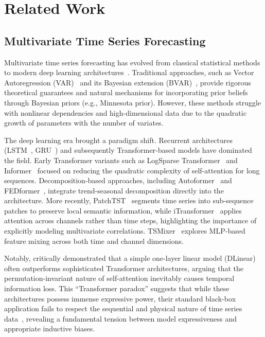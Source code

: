 \section{Related Work}

\subsection{Multivariate Time Series Forecasting}

Multivariate time series forecasting has evolved from classical statistical methods to modern deep learning architectures~\citep{lim2021time}. Traditional approaches, such as Vector Autoregression (VAR)~\citep{lutkepohl2005new} and its Bayesian extension (BVAR)~\citep{banbura2010large}, provide rigorous theoretical guarantees and natural mechanisms for incorporating prior beliefs through Bayesian priors (e.g., Minnesota prior). However, these methods struggle with nonlinear dependencies and high-dimensional data due to the quadratic growth of parameters with the number of variates.

The deep learning era brought a paradigm shift. Recurrent architectures (LSTM~\citep{hochreiter1997long}, GRU~\citep{cho2014learning}) and subsequently Transformer-based models have dominated the field. Early Transformer variants such as LogSparse Transformer~\citep{li2019enhancing} and Informer~\citep{zhou2021informer} focused on reducing the quadratic complexity of self-attention for long sequences. Decomposition-based approaches, including Autoformer~\citep{wu2021autoformer} and FEDformer~\citep{zhou2022fedformer}, integrate trend-seasonal decomposition directly into the architecture. More recently, PatchTST~\citep{nie2023time} segments time series into sub-sequence patches to preserve local semantic information, while iTransformer~\citep{liu2024itransformer} applies attention across channels rather than time steps, highlighting the importance of explicitly modeling multivariate correlations. TSMixer~\citep{chen2023tsmixer} explores MLP-based feature mixing across both time and channel dimensions.

Notably, \citet{zeng2023transformers} critically demonstrated that a simple one-layer linear model (DLinear) often outperforms sophisticated Transformer architectures, arguing that the permutation-invariant nature of self-attention inevitably causes temporal information loss. This ``Transformer paradox'' suggests that while these architectures possess immense expressive power, their standard black-box application fails to respect the sequential and physical nature of time series data~\citep{zhou2025transformers}, revealing a fundamental tension between model expressiveness and appropriate inductive biases.

